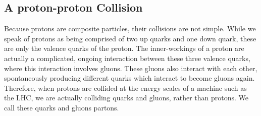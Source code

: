 \vspace{5mm}

\subsection{A \textbf{proton-proton} Collision}

Because protons are composite particles, their collisions are not simple. While we speak of protons as being comprised of two up quarks and one down quark, these are only the valence quarks of the proton. The inner-workings of a proton are actually a complicated, ongoing interaction between these three valence quarks, where this interaction involves gluons. These gluons also interact with each other, spontaneously producing different quarks which interact to become gluons again. Therefore, when protons are collided at the energy scales of a machine such as the LHC, we are actually colliding quarks and gluons, rather than protons. We call these quarks and gluons partons.


